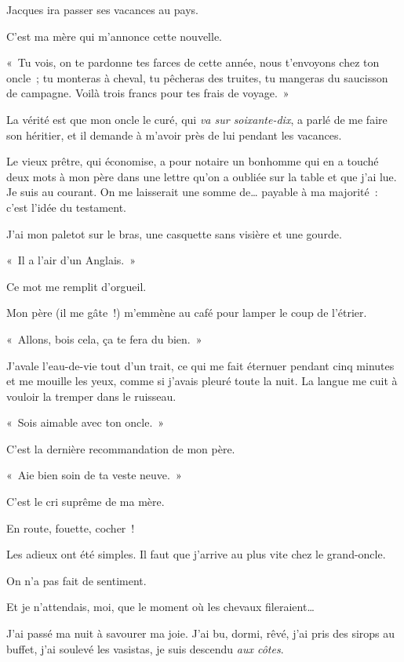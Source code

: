 \documentclass[french,twoside]{book} %
\begin{document}
\noindent Jacques ira passer ses vacances au pays.\par
C’est ma mère qui m’annonce cette nouvelle.\par
« Tu vois, on te pardonne tes farces de cette année, nous t’envoyons chez ton oncle ; tu monteras à cheval, tu pêcheras des truites, tu mangeras du saucisson de campagne. Voilà trois francs pour tes frais de voyage. »\par
La vérité est que mon oncle le curé, qui \emph{va sur soixante-dix}, a parlé de me faire son héritier, et il demande à m’avoir près de lui pendant les vacances.\par
Le vieux prêtre, qui économise, a pour notaire un bonhomme qui en a touché deux mots à mon père dans une lettre qu’on a oubliée sur la table et que j’ai lue. Je suis au courant. On me laisserait une somme de… payable à ma majorité : c’est l’idée du testament.\par
\bigbreak
\noindent J’ai mon paletot sur le bras, une casquette sans visière et une gourde.\par
« Il a l’air d’un Anglais. »\par
Ce mot me remplit d’orgueil.\par
Mon père (il me gâte !) m’emmène au café pour lamper le coup de l’étrier.\par
« Allons, bois cela, ça te fera du bien. »\par
J’avale l’eau-de-vie tout d’un trait, ce qui me fait éternuer pendant cinq minutes et me mouille les yeux, comme si j’avais pleuré toute la nuit. La langue me cuit à vouloir la tremper dans le ruisseau.\par
« Sois aimable avec ton oncle. »\par
C’est la dernière recommandation de mon père.\par
« Aie bien soin de ta veste neuve. »\par
C’est le cri suprême de ma mère.\par
\bigbreak
\noindent En route, fouette, cocher !\par
\bigbreak
\noindent Les adieux ont été simples. Il faut que j’arrive au plus vite chez le grand-oncle.\par
On n’a pas fait de sentiment.\par
Et je n’attendais, moi, que le moment où les chevaux fileraient…\par
\bigbreak
\noindent J’ai passé ma nuit à savourer ma joie. J’ai bu, dormi, rêvé, j’ai pris des sirops au buffet, j’ai soulevé les vasistas, je suis descendu\emph{ aux côtes}.\par
\end{document}
